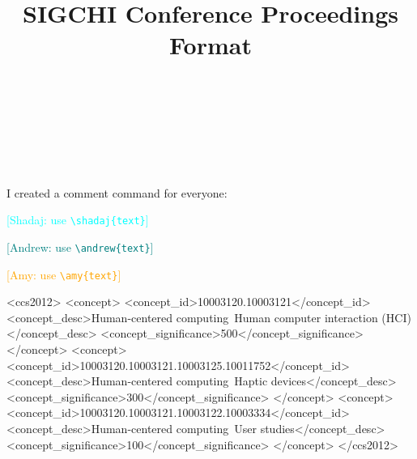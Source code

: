 \documentclass{sigchi}
\def\plaintitle{SIGCHI Conference Proceedings Format}
\begin{document}
\title{\plaintitle}

\author{%
  \\
  \\
  \\
  \\
}

\maketitle

\newcommand{\note}[2]{\textcolor{#1}{[#2]}}
\newcommand{\mick}[1]{\note{blue}{Mick: #1}}
\newcommand{\shadaj}[1]{\note{cyan}{Shadaj: #1}}
\newcommand{\andrew}[1]{\note{teal}{Andrew: #1}}
\newcommand{\amy}[1]{\note{orange}{Amy: #1}}
\newcommand{\todo}[1]{\note{red}{Todo: #1}}

I created a comment command for everyone:

\shadaj{use \texttt{\textbackslash shadaj\{text\}}}

\andrew{use \texttt{\textbackslash andrew\{text\}}}

\amy{use \texttt{\textbackslash amy\{text\}}}




\begin{CCSXML}
<ccs2012>
    <concept>
        <concept_id>10003120.10003121</concept_id>
        <concept_desc>Human-centered computing~Human computer interaction (HCI)</concept_desc>
        <concept_significance>500</concept_significance>
    </concept>
    <concept>
        <concept_id>10003120.10003121.10003125.10011752</concept_id>
        <concept_desc>Human-centered computing~Haptic devices</concept_desc>
        <concept_significance>300</concept_significance>
    </concept>
    <concept>
        <concept_id>10003120.10003121.10003122.10003334</concept_id>
        <concept_desc>Human-centered computing~User studies</concept_desc>
        <concept_significance>100</concept_significance>
    </concept>
</ccs2012>
\end{CCSXML}
\end{document}
